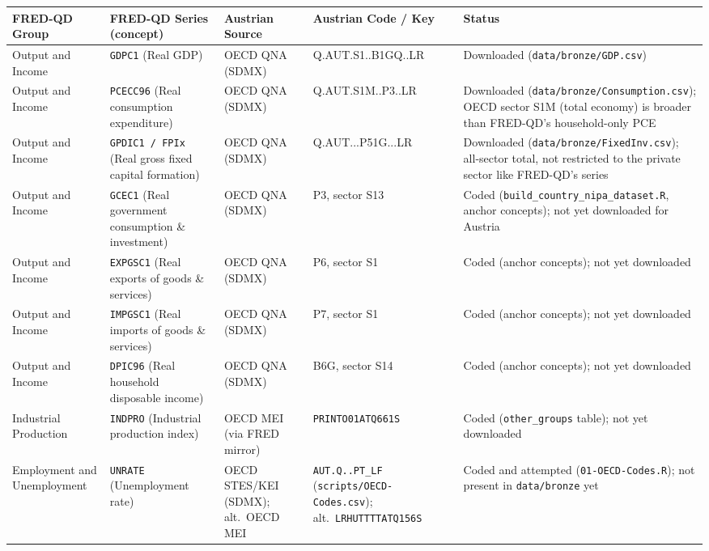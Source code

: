 \documentclass[11pt]{article}
\begin{document}
\begin{landscape}
\begin{longtable}{L{3cm} L{4.3cm} L{3.2cm} L{3.8cm} L{6.2cm}}
\toprule
\textbf{FRED-QD Group} & \textbf{FRED-QD Series (concept)} & \textbf{Austrian Source} & \textbf{Austrian Code / Key} & \textbf{Status} \\
\midrule
\endhead
Output and Income & \texttt{GDPC1} (Real GDP) & OECD QNA (SDMX) & Q.\allowbreak{}AUT.\allowbreak{}S1.\allowbreak{}.\allowbreak{}B1GQ.\allowbreak{}.\allowbreak{}LR & Downloaded (\texttt{data/\allowbreak{}bronze/\allowbreak{}GDP.\allowbreak{}csv}) \\
Output and Income & \texttt{PCECC96} (Real consumption expenditure) & OECD QNA (SDMX) & Q.\allowbreak{}AUT.\allowbreak{}S1M.\allowbreak{}.\allowbreak{}P3.\allowbreak{}.\allowbreak{}LR & Downloaded (\texttt{data/\allowbreak{}bronze/\allowbreak{}Consumption.\allowbreak{}csv}); OECD sector S1M (total economy) is broader than FRED-QD's household-only PCE \\
Output and Income & \texttt{GPDIC1 / FPIx} (Real gross fixed capital formation) & OECD QNA (SDMX) & Q.\allowbreak{}AUT.\allowbreak{}.\allowbreak{}.\allowbreak{}P51G.\allowbreak{}.\allowbreak{}.\allowbreak{}LR & Downloaded (\texttt{data/\allowbreak{}bronze/\allowbreak{}FixedInv.\allowbreak{}csv}); all-sector total, not restricted to the private sector like FRED-QD's series \\
Output and Income & \texttt{GCEC1} (Real government consumption \& investment) & OECD QNA (SDMX) & P3, sector S13 & Coded (\texttt{build\_\allowbreak{}country\_\allowbreak{}nipa\_\allowbreak{}dataset.\allowbreak{}R}, anchor concepts); not yet downloaded for Austria \\
Output and Income & \texttt{EXPGSC1} (Real exports of goods \& services) & OECD QNA (SDMX) & P6, sector S1 & Coded (anchor concepts); not yet downloaded \\
Output and Income & \texttt{IMPGSC1} (Real imports of goods \& services) & OECD QNA (SDMX) & P7, sector S1 & Coded (anchor concepts); not yet downloaded \\
Output and Income & \texttt{DPIC96} (Real household disposable income) & OECD QNA (SDMX) & B6G, sector S14 & Coded (anchor concepts); not yet downloaded \\
Industrial Production & \texttt{INDPRO} (Industrial production index) & OECD MEI (via FRED mirror) & \texttt{PRINTO01ATQ661S} & Coded (\texttt{other\_\allowbreak{}groups} table); not yet downloaded \\
Employment and Unemployment & \texttt{UNRATE} (Unemployment rate) & OECD STES/KEI (SDMX); alt.\ OECD MEI & \texttt{AUT.\allowbreak{}Q.\allowbreak{}.\allowbreak{}PT\_\allowbreak{}LF} (\texttt{scripts/\allowbreak{}OECD-Codes.\allowbreak{}csv}); alt.\allowbreak{}\ \texttt{LRHUTTTTATQ156S} & Coded and attempted (\texttt{01-OECD-Codes.\allowbreak{}R}); not present in \texttt{data/\allowbreak{}bronze} yet \\

\end{longtable}
\end{landscape}
\end{document}

